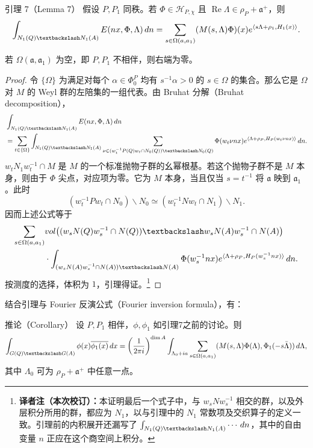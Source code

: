 \begin{originaltheorem}{引理 7（Lemma 7）}
假设 $P,P_1$ 同秩。若 $\Phi\in\mathcal H_{P,\chi}$ 且
$\operatorname{Re}\Lambda\in\rho_P+\mathfrak a^+$，则
\[
 \int_{N_1(\Q)\backslash N_1(A)}E(nx,\Phi,\Lambda)\,dn
 =\sum_{s\in\Omega(\mathfrak a,\mathfrak a_1)}
 (M(s,\Lambda)\Phi)(x)e^{\langle s\Lambda+\rho_1,H_1(x)\rangle}.
\]
\end{originaltheorem}
若 $\Omega(\mathfrak a,\mathfrak a_1)$ 为空，即 $P,P_1$ 不相伴，则右端为零。
\begin{proof}
令 $\{\Omega\}$ 为满足对每个 $\alpha\in\Phi_0^P$ 均有 $s^{-1}\alpha>0$ 的 $s\in\Omega$ 的集合。那么它是 $\Omega$ 对 $M$ 的 Weyl 群的左陪集的一组代表。由 Bruhat 分解（Bruhat decomposition），
\[
\begin{split}
 &\int_{N_1(\Q)\backslash N_1(A)}E(nx,\Phi,\Lambda)\,dn\\
 &=\sum_{t\in\{\Omega\}}\int_{N_1(\Q)\backslash N_1(A)}
 \sum_{\nu\in(w_t^{-1}P(\Q)w_t\cap N_0(\Q))\backslash N_0(\Q)}
 \Phi(w_t\nu nx)e^{\langle\Lambda+\rho_P,H_P(w_t\nu nx)\rangle}\,dn.
\end{split}
\]
$w_tN_1w_t^{-1}\cap M$ 是 $M$ 的一个标准抛物子群的幺幂根基。若这个抛物子群不是 $M$ 本身，则由于 $\Phi$ 尖点，对应项为零。它为 $M$ 本身，当且仅当 $s=t^{-1}$ 将 $\mathfrak a$ 映到 $\mathfrak a_1$。此时
\[
 (w_t^{-1}Pw_t\cap N_0)\backslash N_0
 \simeq(w_t^{-1}Nw_t\cap N_1)\backslash N_1.
\]
因而上述公式等于
\[
\begin{split}
 \sum_{s\in\Omega(\mathfrak a,\mathfrak a_1)}
 &\operatorname{vol}\bigl((w_sN(\Q)w_s^{-1}\cap N(\Q))\backslash
 w_sN(A)w_s^{-1}\cap N(A)\bigr)\\
 &\cdot\int_{(w_sN(A)w_s^{-1}\cap N(A))\backslash N(A)}
 \Phi(w_s^{-1}nx)e^{\langle\Lambda+\rho_P,H_P(w_s^{-1}nx)\rangle}\,dn.
\end{split}
\]
按测度的选择，体积为 $1$，引理得证。\footnote{\textbf{译者注（本次校订）：}本证明最后一个式子中，与 $w_sNw_s^{-1}$ 相交的群，以及外层积分所用的群，都应为 $N_1$，以与引理中的 $N_1$ 常数项及交织算子的定义一致。引理前的内积展开还漏写了 $\int_{N_1(\Q)\backslash N_1(A)}\cdots\,dn$，其中的自由变量 $n$ 正应在这个商空间上积分。}
\end{proof}
结合引理与 Fourier 反演公式（Fourier inversion formula），有：
\begin{originaltheorem}{推论（Corollary）}
设 $P,P_1$ 相伴，$\phi,\phi_1$ 如引理7之前的讨论。则
\[
\begin{split}
 \int_{G(\Q)\backslash G(A)}\widehat\phi(x)\overline{\widehat\phi_1(x)}\,dx
 =\left(\frac1{2\pi i}\right)^{\dim A}
 \int_{\Lambda_0+i\mathfrak a}\sum_{s\in\Omega(\mathfrak a,\mathfrak a_1)}
 (M(s,\Lambda)\Phi(\Lambda),\Phi_1(-s\bar\Lambda))\,d\Lambda,
\end{split}
\]
其中 $\Lambda_0$ 可为 $\rho_P+\mathfrak a^+$ 中任意一点。
\end{originaltheorem}

